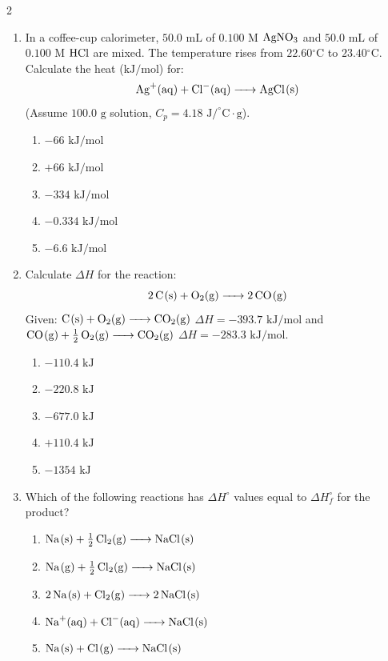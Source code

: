 \documentclass[12pt,letterpaper]{article}
\begin{document}
\begin{multicols*}{2}
\begin{enumerate}
        \item In a coffee-cup calorimeter, $50.0\text{ mL}$ of $0.100\text{ M}$ $\ce{AgNO3}$ and $50.0\text{ mL}$ of $0.100\text{ M}$ $\ce{HCl}$ are mixed. The temperature rises from $22.60\text{}^\circ\text{C}$ to $23.40\text{}^\circ\text{C}$. Calculate the heat ($\text{kJ/mol}$) for:
            \begin{equation*}
                \ce{Ag+(aq) + Cl-(aq) -> AgCl(s)}
            \end{equation*}
            (Assume $100.0\text{ g}$ solution, $C_p = 4.18\text{ J/}^\circ\text{C}\cdot\text{g}$). %
            \begin{enumerate}
                \item $-66\text{ kJ/mol}$
                \item $+66\text{ kJ/mol}$
                \item $-334\text{ kJ/mol}$
                \item $-0.334\text{ kJ/mol}$
                \item $-6.6\text{ kJ/mol}$
            \end{enumerate}
        \columnbreak
        \item Calculate $\Delta H$ for the reaction:
            \begin{equation*}
                \ce{2C(s) + O2(g) -> 2CO(g)}
            \end{equation*}
            Given: $\ce{C(s) + O2(g) -> CO2(g)}$ $\Delta H = -393.7\text{ kJ/mol}$ and $\ce{CO(g) + 1/2O2(g) -> CO2(g)}$ $\Delta H = -283.3\text{ kJ/mol}$. %
            \begin{enumerate}
                \item $-110.4\text{ kJ}$
                \item $-220.8\text{ kJ}$
                \item $-677.0\text{ kJ}$
                \item $+110.4\text{ kJ}$
                \item $-1354\text{ kJ}$
            \end{enumerate}

        \item Which of the following reactions has $\Delta H^\circ$ values equal to $\Delta H_f^\circ$ for the product? %
            \begin{enumerate}
                \item $\ce{Na(s) + 1/2Cl2(g) -> NaCl(s)}$
                \item $\ce{Na(g) + 1/2Cl2(g) -> NaCl(s)}$
                \item $\ce{2Na(s) + Cl2(g) -> 2NaCl(s)}$
                \item $\ce{Na+(aq) + Cl-(aq) -> NaCl(s)}$
                \item $\ce{Na(s) + Cl(g) -> NaCl(s)}$
            \end{enumerate}


\end{enumerate}
\end{multicols*}
\end{document}

